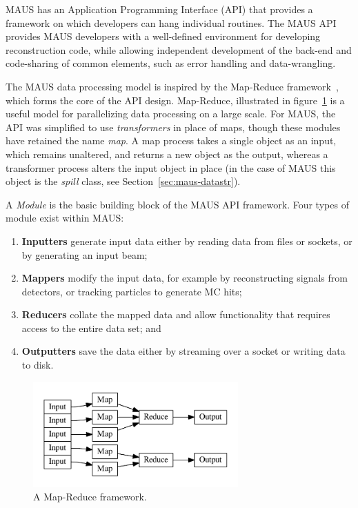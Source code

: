 \documentclass{JINST}
\begin{document}
MAUS has an Application Programming Interface (API) that provides a framework on which developers can hang individual routines. The MAUS API provides MAUS developers with a well-defined environment for developing reconstruction code, while allowing independent development of the back-end and code-sharing of common elements, such as error handling and data-wrangling. 

The MAUS data processing model is inspired by the Map-Reduce framework~\cite{MapReduce}, which forms the core of the API design. Map-Reduce, illustrated in figure~\ref{fig:mapreduce} is a useful model for parallelizing data processing on a large scale. For MAUS, the API was simplified to use \emph{transformers} in place of maps, though these modules have retained the name \emph{map}. A map process takes a single object as an input, which remains unaltered, and returns a new object as the output, whereas a transformer process alters the input object in place (in the case of MAUS this object is the \emph{spill} class, see Section~\ref{sec:maus-datastr}).

A \emph{Module} is the basic building block of the MAUS API framework. Four types of module exist within MAUS:

\begin{enumerate}
\item \textbf{Inputters} generate input data either by reading data from files or sockets, or by generating an input beam;
\item \textbf{Mappers} modify the input data, for example by reconstructing signals from detectors, or tracking  particles to generate MC hits;
\item \textbf{Reducers} collate the mapped data and allow functionality that requires access to the entire data set; and
\item \textbf{Outputters} save the data  either by streaming over a socket or writing data to disk.
\end{enumerate}

\begin{figure}[!htb]
\centering
\includegraphics[width=0.7\textwidth]{figs/map_reduce.pdf}
\caption{A Map-Reduce framework.}
\label{fig:mapreduce}
\end{figure}
\end{document}
